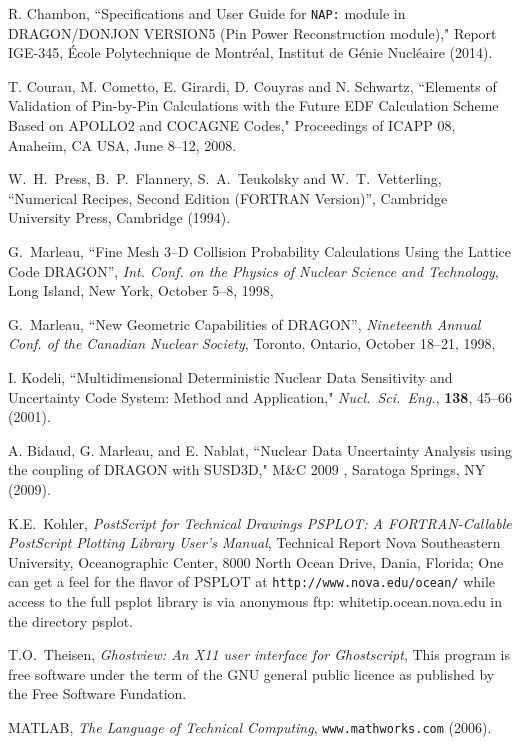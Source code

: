 \begin{thebibliography}{99}
R. Chambon, ``Specifications and User Guide for {\tt NAP:} module in DRAGON/DONJON VERSION5
(Pin Power Reconstruction module)," Report IGE-345,
\'Ecole Polytechnique de Montr\'eal,
 Institut de G\'enie Nucl\'eaire (2014).

T. Courau, M. Cometto, E. Girardi, D. Couyras and N. Schwartz, ``Elements of Validation of Pin-by-Pin Calculations with the Future EDF Calculation Scheme Based on APOLLO2 and COCAGNE Codes," Proceedings of ICAPP 08, Anaheim, CA USA, June 8--12, 2008.

W.~H.~Press, B.~P.~Flannery, S.~A.~Teukolsky and W.~T.~Vetterling, ``Numerical
Recipes, Second Edition (FORTRAN Version)'', Cambridge University Press,
Cambridge (1994).

G.~Marleau, 
``Fine Mesh 3--D Collision Probability Calculations Using the Lattice Code DRAGON'',
\textsl{Int. Conf. on the Physics of Nuclear Science and Technology}, 
Long Island, New York, October 5--8, 1998,

G.~Marleau, 
``New Geometric Capabilities of DRAGON'',
\textsl{Nineteenth Annual Conf. of the Canadian Nuclear Society}, 
Toronto, Ontario, October 18--21, 1998,

I. Kodeli, ``Multidimensional Deterministic Nuclear Data Sensitivity and Uncertainty Code System: Method and Application,"
{\sl Nucl.~Sci.~Eng.}, {\bf 138}, 45--66 (2001).

A. Bidaud, G. Marleau, and E. Nablat, ``Nuclear Data Uncertainty Analysis using the coupling of DRAGON with SUSD3D," M\&C 2009 , Saratoga Springs, NY (2009).

K.E.~Kohler, 
\textsl{PostScript for Technical Drawings PSPLOT: A FORTRAN-Callable PostScript Plotting
Library User's Manual}, 
Technical Report Nova Southeastern University, Oceanographic
Center, 8000 North Ocean Drive, Dania, Florida; One can get a feel for the flavor of
PSPLOT at {\tt http://www.nova.edu/ocean/} while access to the full psplot library is via
anonymous ftp: whitetip.ocean.nova.edu in the directory psplot. 

T.O.~Theisen, 
\textsl{Ghostview: An X11 user interface for Ghostscript}, 
This program is free software under the term of the GNU general public licence as
published by the Free Software Fundation.

MATLAB, {\sl The Language of Technical Computing}, {\tt www.mathworks.com} (2006). 


\end{thebibliography}
